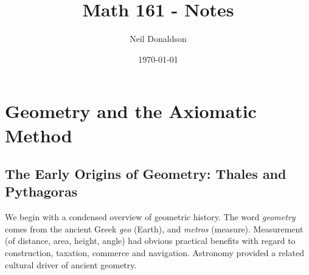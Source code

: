 \thispagestyle{empty}
\graphicspath{{1axioms/asy/}}

\title{Math 161 - Notes}
\author{Neil Donaldson}
\date{\today}
\maketitle


\section{Geometry and the Axiomatic Method}\label{chap:acioms}

\subsection{The Early Origins of Geometry: Thales and Pythagoras}\label{sec:thales}


We begin with a condensed overview of geometric history. The word \emph{geometry} comes from the ancient Greek \emph{geo} (Earth), and \emph{metros} (measure). Measurement (of distance, area, height, angle) had obvious practical benefits with regard to construction, taxation, commerce and navigation. Astronomy provided a related cultural driver of ancient geometry.


